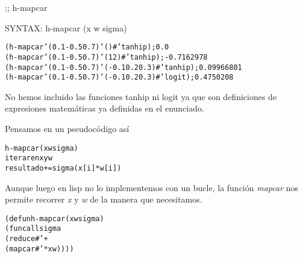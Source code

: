 \begin{aibox}{\function}
;; h-mapcar

SYNTAX: h-mapcar (x w sigma) 
\end{aibox}

\begin{aibox}{\examples}
\begin{alltt}
(h-mapcar '(0.1 -0.5 0.7) '() #'tanhip); 0.0
(h-mapcar '(0.1 -0.5 0.7) '(1 2) #'tanhip); -0.7162978
(h-mapcar '(0.1 -0.5 0.7) '(-0.1 0.2 0.3) #'tanhip); 0.09966801
(h-mapcar '(0.1 -0.5 0.7) '(-0.1 0.2 0.3) #'logit); 0.4750208
\end{alltt}
\end{aibox}

\begin{aibox}{\comments}
No hemos incluido las funciones tanhip ni logit ya que son definiciones de expresiones matemáticas ya definidas en el enunciado.
\end{aibox}
\begin{aibox}{\pseudocode}
Pensamos en un pseudocódigo así
\begin{alltt}
h-mapcar (x w sigma)
    iterar en x y w
        resultado += sigma(x[i]*w[i])
   
\end{alltt}

Aunque luego en lisp no lo implementemos con un bucle, la función \emph{mapcar} nos permite recorrer \emph{x} y \emph{w} de la manera que necesitamos.
\end{aibox}
\begin{aibox}{\code}

\begin{alltt}
(defun h-mapcar (x w sigma) 
    (funcall sigma 
        (reduce #'+
            (mapcar #'* x w))))
\end{alltt}
\end{aibox}
